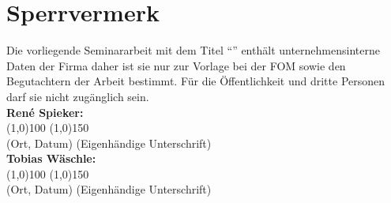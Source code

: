 \section*{Sperrvermerk}
Die vorliegende Seminararbeit mit dem Titel ``\MyTitel{}'' enthält unternehmensinterne Daten der Firma \MyFirma{} daher ist sie nur zur Vorlage bei der FOM sowie den Begutachtern der Arbeit bestimmt. Für die Öffentlichkeit und dritte Personen darf sie nicht zugänglich sein.
\\[3cm]
\textbf{René Spieker:}\\[1cm]
\line(1,0){100} \hfill \line(1,0){150}\\
(Ort, Datum) \hfill (Eigenhändige Unterschrift)\\[2cm]
\textbf{Tobias Wäschle:}\\[1cm]
\line(1,0){100} \hfill \line(1,0){150}\\
(Ort, Datum) \hfill (Eigenhändige Unterschrift)